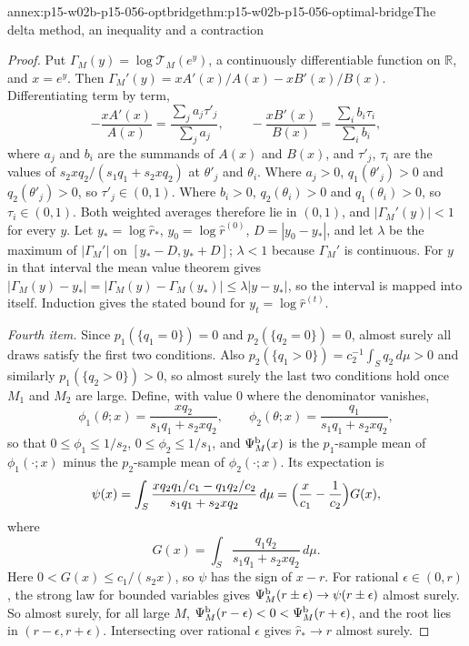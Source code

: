 \begin{annexitem}{annex:p15-w02b-p15-056-optbridge}{thm:p15-w02b-p15-056-optimal-bridge}{The delta method, an inequality and a contraction}
\begin{proof}
Put \(\Gamma_M(y)=\log\mathcal T_M(e^y)\), a continuously differentiable
function on \(\mathbb R\), and \(x=e^y\). Then
\(\Gamma_M'(y)=xA'(x)/A(x)-xB'(x)/B(x)\). Differentiating term by term,
\[
 -\frac{xA'(x)}{A(x)}=\frac{\sum_ja_j\tau'_j}{\sum_ja_j},\qquad
 -\frac{xB'(x)}{B(x)}=\frac{\sum_ib_i\tau_i}{\sum_ib_i},
\]
where \(a_j\) and \(b_i\) are the summands of \(A(x)\) and \(B(x)\), and
\(\tau'_j\), \(\tau_i\) are the values of
\(s_2xq_2/(s_1q_1+s_2xq_2)\) at \(\theta'_j\) and \(\theta_i\). Where
\(a_j>0\), \(q_1(\theta'_j)>0\) and \(q_2(\theta'_j)>0\), so
\(\tau'_j\in(0,1)\). Where \(b_i>0\), \(q_2(\theta_i)>0\) and
\(q_1(\theta_i)>0\), so \(\tau_i\in(0,1)\). Both weighted averages
therefore lie in \((0,1)\), and \(|\Gamma_M'(y)|<1\) for every \(y\). Let
\(y_*=\log\widehat r_*\), \(y_0=\log\widehat r^{(0)}\),
\(D=|y_0-y_*|\), and let \(\lambda\) be the maximum of \(|\Gamma_M'|\) on
\([y_*-D,y_*+D]\); \(\lambda<1\) because \(\Gamma_M'\) is continuous. For
\(y\) in that interval the mean value theorem gives
\(|\Gamma_M(y)-y_*|=|\Gamma_M(y)-\Gamma_M(y_*)|\leq\lambda|y-y_*|\), so the
interval is mapped into itself. Induction gives the stated bound for
\(y_t=\log\widehat r^{(t)}\).

\emph{Fourth item.} Since \(p_1(\{q_1=0\})=0\) and \(p_2(\{q_2=0\})=0\),
almost surely all draws satisfy the first two conditions. Also
\(p_2(\{q_1>0\})=c_2^{-1}\int_Sq_2\,d\mu>0\) and similarly
\(p_1(\{q_2>0\})>0\), so almost surely the last two conditions hold once
\(M_1\) and \(M_2\) are large. Define, with value \(0\) where the
denominator vanishes,
\[
 \phi_1(\theta;x)=\frac{xq_2}{s_1q_1+s_2xq_2},\qquad
 \phi_2(\theta;x)=\frac{q_1}{s_1q_1+s_2xq_2},
\]
so that \(0\leq\phi_1\leq1/s_2\), \(0\leq\phi_2\leq1/s_1\), and
\(\Psi^{\rm b}_M(x)\) is the \(p_1\)-sample mean of \(\phi_1(\cdot;x)\)
minus the \(p_2\)-sample mean of \(\phi_2(\cdot;x)\). Its expectation is
\[
 \psi(x)=\int_S\frac{xq_2q_1/c_1-q_1q_2/c_2}{s_1q_1+s_2xq_2}\,d\mu
 =\Bigl(\frac x{c_1}-\frac1{c_2}\Bigr)G(x),
\]
where
\[
 G(x)=\int_S\frac{q_1q_2}{s_1q_1+s_2xq_2}\,d\mu .
\]
Here \(0<G(x)\leq c_1/(s_2x)\), so \(\psi\) has the sign of \(x-r\). For
rational \(\epsilon\in(0,r)\), the strong law for bounded variables gives
\(\Psi^{\rm b}_M(r\pm\epsilon)\to\psi(r\pm\epsilon)\) almost surely. So
almost surely, for all large \(M\),
\(\Psi^{\rm b}_M(r-\epsilon)<0<\Psi^{\rm b}_M(r+\epsilon)\), and the root
lies in \((r-\epsilon,r+\epsilon)\). Intersecting over rational
\(\epsilon\) gives \(\widehat r_*\to r\) almost surely.


\end{proof}
\end{annexitem}
